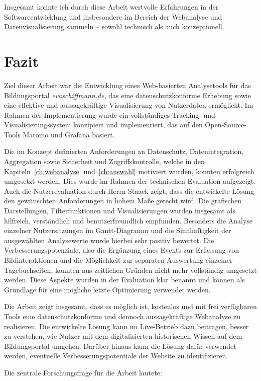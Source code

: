 Insgesamt konnte ich durch diese Arbeit wertvolle Erfahrungen in der Softwareentwicklung und insbesondere im Bereich der Webanalyse und Datenvisualisierung sammeln – sowohl technisch als auch konzeptionell. 

\section{Fazit}
Ziel dieser Arbeit war die Entwicklung eines Web-basierten Analysetools für das Bildungsportal \textit{evaschiffmann.de}, das eine datenschutzkonforme Erhebung sowie eine effektive und aussagekräftige Visualisierung von Nutzerdaten ermöglicht. Im Rahmen der Implementierung wurde ein vollständiges Tracking- und Visualisierungssystem konzipiert und implementiert, das auf den Open-Source-Tools Matomo und Grafana basiert.

Die im Konzept definierten Anforderungen an Datenschutz, Datenintegration, Aggregation sowie Sicherheit und Zugriffskontrolle, welche in den Kapiteln~\ref{ch:webanalyse} und~\ref{ch:auswahl} motiviert wurden, konnten erfolgreich umgesetzt werden. Dies wurde im Rahmen der technischen Evaluation aufgezeigt. Auch die Nutzerevaluation durch Herrn Staack zeigt, dass die entwickelte Lösung den gewünschten Anforderungen in hohem Maße gerecht wird. Die grafischen Darstellungen, Filterfunktionen und Visualisierungen wurden insgesamt als hilfreich, verständlich und benutzerfreundlich empfunden. Besonders die Analyse einzelner Nutzersitzungen im Gantt-Diagramm und die Sinnhaftigkeit der ausgewählten Analysewerte wurde hierbei sehr positiv bewertet. Die Verbesserungspotenziale, also die Ergänzung eines Events zur Erfassung von Bildinteraktionen und die Möglichkeit zur separaten Auswertung einzelner Tagebuchseiten, konnten aus zeitlichen Gründen nicht mehr vollständig umgesetzt werden. Diese Aspekte wurden in der Evaluation klar benannt und können als Grundlage für eine mögliche letzte Optimierung verwendet werden.

Die Arbeit zeigt insgesamt, dass es möglich ist, kostenlos und mit frei verfügbaren Tools eine datenschutzkonforme und dennoch aussagekräftige Webanalyse zu realisieren. Die entwickelte Lösung kann im Live-Betrieb dazu beitragen, besser zu verstehen, wie Nutzer mit dem digitalisierten historischen Wissen auf dem Bildungsportal umgehen. Darüber hinaus kann die Lösung dafür verwendet werden, eventuelle Verbesserungspotentiale der Website zu identifizieren.

Die zentrale Forschungsfrage für die Arbeit lautete: 

